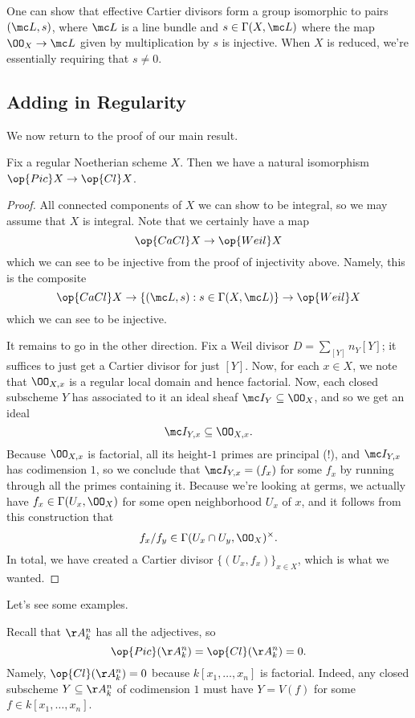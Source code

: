 \documentclass[../notes.tex]{subfiles}
\begin{document}
\begin{remark}
	One can show that effective Cartier divisors form a group isomorphic to pairs $(\mc L,s)$, where $\mc L$ is a line bundle and $s\in\Gamma(X,\mc L)$ where the map $\OO_X\to\mc L$ given by multiplication by $s$ is injective. When $X$ is reduced, we're essentially requiring that $s\ne0$.
\end{remark}

\subsection{Adding in Regularity}
We now return to the proof of our main result.
\begin{theorem}
	Fix a regular Noetherian scheme $X$. Then we have a natural isomorphism $\op{Pic}X\to\op{Cl}X$.
\end{theorem}
\begin{proof}
	All connected components of $X$ we can show to be integral, so we may assume that $X$ is integral. Note that we certainly have a map
	\[\op{CaCl}X\to\op{Weil}X\]
	which we can see to be injective from the proof of injectivity above. Namely, this is the composite
	\[\op{CaCl}X\to\{(\mc L,s):s\in\Gamma(X,\mc L)\}\to\op{Weil}X\]
	which we can see to be injective.

	It remains to go in the other direction. Fix a Weil divisor $D=\sum_{[Y]}n_Y[Y]$; it suffices to just get a Cartier divisor for just $[Y]$. Now, for each $x\in X$, we note that $\OO_{X,x}$ is a regular local domain and hence factorial. Now, each closed subscheme $Y$ has associated to it an ideal sheaf $\mc I_Y\subseteq\OO_X$, and so we get an ideal
	\[\mc I_{Y,x}\subseteq\OO_{X,x}.\]
	Because $\OO_{X,x}$ is factorial, all its height-$1$ primes are principal (!), and $\mc I_{Y,x}$ has codimension $1$, so we conclude that $\mc I_{Y,x}=(f_x)$ for some $f_x$ by running through all the primes containing it. Because we're looking at germs, we actually have $f_x\in\Gamma(U_x,\OO_X)$ for some open neighborhood $U_x$ of $x$, and it follows from this construction that
	\[f_x/f_y\in\Gamma(U_x\cap U_y,\OO_X)^\times.\]
	In total, we have created a Cartier divisor $\{(U_x,f_x)\}_{x\in X}$, which is what we wanted.
\end{proof}
Let's see some examples.
\begin{example}
	Recall that $\AA^n_k$ has all the adjectives, so
	\[\op{Pic}(\AA^n_k)=\op{Cl}(\AA^n_k)=0.\]
	Namely, $\op{Cl}(\AA^n_k)=0$ because $k[x_1,\ldots,x_n]$ is factorial. Indeed, any closed subscheme $Y\subseteq\AA^n_k$ of codimension $1$ must have $Y=V(f)$ for some $f\in k[x_1,\ldots,x_n]$.
\end{example}
\end{document}
